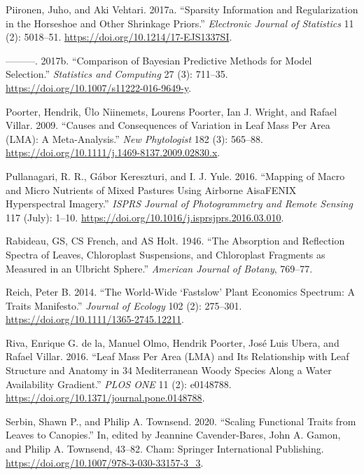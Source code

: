 \documentclass[
  letterpaper,
  DIV=11,
  numbers=noendperiod]{scrartcl}
\newlength{\cslhangindent}
\newlength{\cslentryspacingunit} %
\newenvironment{CSLReferences}[2] %
 {%
  \setlength{\parindent}{0pt}
  \ifodd #1
  \let\oldpar\par
  \def\par{\hangindent=\cslhangindent\oldpar}
  \fi
  \setlength{\parskip}{#2\cslentryspacingunit}
 }%
 {}
\begin{document}
\begin{CSLReferences}{1}{0}
\leavevmode{}%
Piironen, Juho, and Aki Vehtari. 2017a. {``Sparsity Information and
Regularization in the Horseshoe and Other Shrinkage Priors.''}
\emph{Electronic Journal of Statistics} 11 (2): 5018--51.
\url{https://doi.org/10.1214/17-EJS1337SI}.

\leavevmode{}%
---------. 2017b. {``Comparison of Bayesian Predictive Methods for Model
Selection.''} \emph{Statistics and Computing} 27 (3): 711--35.
\url{https://doi.org/10.1007/s11222-016-9649-y}.

\leavevmode{}%
Poorter, Hendrik, Ülo Niinemets, Lourens Poorter, Ian J. Wright, and
Rafael Villar. 2009. {``Causes and Consequences of Variation in Leaf
Mass Per Area (LMA): A Meta-Analysis.''} \emph{New Phytologist} 182 (3):
565--88. \url{https://doi.org/10.1111/j.1469-8137.2009.02830.x}.

\leavevmode{}%
Pullanagari, R. R., Gábor Kereszturi, and I. J. Yule. 2016. {``Mapping
of Macro and Micro Nutrients of Mixed Pastures Using Airborne AisaFENIX
Hyperspectral Imagery.''} \emph{ISPRS Journal of Photogrammetry and
Remote Sensing} 117 (July): 1--10.
\url{https://doi.org/10.1016/j.isprsjprs.2016.03.010}.

\leavevmode{}%
Rabideau, GS, CS French, and AS Holt. 1946. {``The Absorption and
Reflection Spectra of Leaves, Chloroplast Suspensions, and Chloroplast
Fragments as Measured in an Ulbricht Sphere.''} \emph{American Journal
of Botany}, 769--77.

\leavevmode{}%
Reich, Peter B. 2014. {``The World-Wide {`}Fast{\textendash}slow{'}
Plant Economics Spectrum: A Traits Manifesto.''} \emph{Journal of
Ecology} 102 (2): 275--301.
\url{https://doi.org/10.1111/1365-2745.12211}.

\leavevmode{}%
Riva, Enrique G. de la, Manuel Olmo, Hendrik Poorter, José Luis Ubera,
and Rafael Villar. 2016. {``Leaf Mass Per Area (LMA) and Its
Relationship with Leaf Structure and Anatomy in 34 Mediterranean Woody
Species Along a Water Availability Gradient.''} \emph{PLOS ONE} 11 (2):
e0148788. \url{https://doi.org/10.1371/journal.pone.0148788}.

\leavevmode{}%
Serbin, Shawn P., and Philip A. Townsend. 2020. {``Scaling Functional
Traits from Leaves to Canopies.''} In, edited by Jeannine
Cavender-Bares, John A. Gamon, and Philip A. Townsend, 43--82. Cham:
Springer International Publishing.
\url{https://doi.org/10.1007/978-3-030-33157-3_3}.


\end{CSLReferences}
\end{document}
